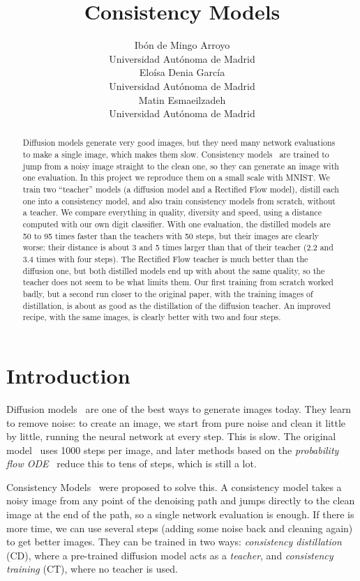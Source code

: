 \documentclass{article}
\title{Consistency Models}
\author{
Ibón de Mingo Arroyo \\
Universidad Autónoma de Madrid \\
\And
Eloísa Denia García \\
Universidad Autónoma de Madrid \\
\And
Matin Esmaeilzadeh \\
Universidad Autónoma de Madrid \\
}
\begin{document}
\maketitle

\begin{abstract}
Diffusion models generate very good images, but they need many network
evaluations to make a single image, which makes them slow. Consistency
models~\cite{song2023consistency} are trained to jump from a noisy image
straight to the clean one, so they can generate an image with one evaluation.
In this project we reproduce them on a small scale with MNIST. We train two
``teacher'' models (a diffusion model and a Rectified Flow model), distill each
one into a consistency model, and also train consistency models from scratch,
without a teacher. We compare everything in quality, diversity and speed, using
a distance computed with our own digit classifier. With one evaluation, the
distilled models are 50 to 95 times faster than the teachers with 50 steps, but
their images are clearly worse: their distance is about 3 and 5 times larger than that
of their teacher (2.2 and 3.4 times with four steps). The Rectified Flow teacher
is much better than the diffusion one, but both distilled models end up with
about the same quality, so the teacher does not seem to be what limits them. Our
first training from scratch worked badly, but a second run closer to the original
paper, with the training images of distillation, is about as good as the
distillation of the diffusion teacher. An improved recipe, with the same images,
is clearly better with two and four steps.
\end{abstract}

\section{Introduction}
\label{sec:introduction}

Diffusion models~\cite{ho2020ddpm,song2021sde} are one of the best ways to
generate images today. They learn to remove noise: to create an image, we start
from pure noise and clean it little by little, running the neural network at
every step. This is slow. The original model~\cite{ho2020ddpm} uses 1000 steps
per image, and later methods based on the \emph{probability flow
ODE}~\cite{song2021sde} reduce this to tens of steps, which is still a lot.

Consistency Models~\cite{song2023consistency} were proposed to solve this. A
consistency model takes a noisy image from any point of the denoising path and
jumps directly to the clean image at the end of the path, so a single network
evaluation is enough. If there is more time, we can use several steps (adding
some noise back and cleaning again) to get better images. They can be trained in
two ways: \emph{consistency distillation} (CD), where a pre-trained diffusion
model acts as a \emph{teacher}, and \emph{consistency training} (CT), where no
teacher is used.
\end{document}
